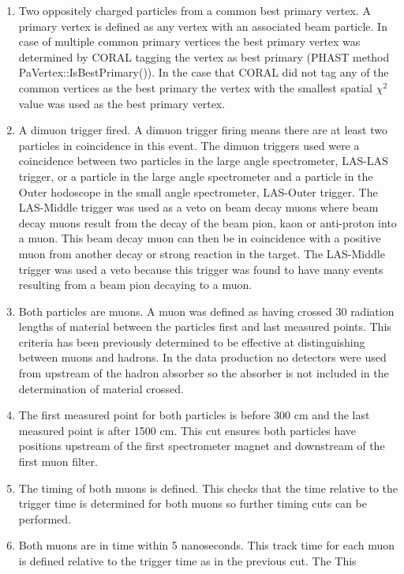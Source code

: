\begin{enumerate}
  \label{tab::cutdescrip}
\item Two oppositely charged particles from a common best primary vertex.  A
  primary vertex is defined as any vertex with an associated beam particle.  In
  case of multiple common primary vertices the best primary vertex was
  determined by CORAL tagging the vertex as best primary (PHAST method
  PaVertex::IsBestPrimary()).  In the case that CORAL did not tag any of the
  common vertices as the best primary the vertex with the smallest spatial
  $\chi^2$ value was used as the best primary vertex.
\item A dimuon trigger fired.  A dimuon trigger firing means there are at least
  two particles in coincidence in this event. The dimuon triggers used were a
  coincidence between two particles in the large angle spectrometer, LAS-LAS
  trigger, or a particle in the large angle spectrometer and a particle in the
  Outer hodoscope in the small angle spectrometer, LAS-Outer trigger.  The
  LAS-Middle trigger was used as a veto on beam decay muons where beam decay
  muons result from the decay of the beam pion, kaon or anti-proton into a muon.
  This beam decay muon can then be in coincidence with a positive muon from
  another decay or strong reaction in the target.  The LAS-Middle trigger was
  used a veto because this trigger was found to have many events
  resulting from a beam pion decaying to a muon.
\item Both particles are muons.  A muon was defined as having crossed 30
  radiation lengths of material between the particles first and last measured
  points.  This criteria has been previously determined to be effective at
  distinguishing between muons and hadrons.  In the data production no
  detectors were used from upstream of the hadron absorber so the absorber is
  not included in the determination of material crossed.
\item The first measured point for both particles is before 300 cm and the last
  measured point is after 1500 cm.  This cut ensures both particles have
  positions upstream of the first spectrometer magnet and downstream of the
  first muon filter.
\item The timing of both muons is defined.  This checks that the time relative
  to the trigger time is determined for both muons so further timing cuts can be
  performed.
\item Both muons are in time within 5 nanoseconds.  This track time for each
  muon is defined relative to the trigger time as in the previous cut.  The This

\end{enumerate}
